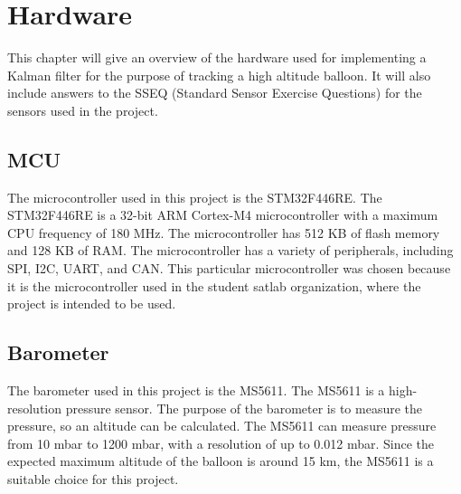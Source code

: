 \chapter{Hardware}\label{ch:hardware}
This chapter will give an overview of the hardware used for implementing a Kalman filter for the purpose of tracking a high altitude balloon.
It will also include answers to the SSEQ (Standard Sensor Exercise Questions) for the sensors used in the project.

\section{MCU}\label{sec:mcu}
The microcontroller used in this project is the STM32F446RE. The STM32F446RE is a 32-bit ARM Cortex-M4 microcontroller with a maximum CPU frequency of 180 MHz. 
The microcontroller has 512 KB of flash memory and 128 KB of RAM. 
The microcontroller has a variety of peripherals, including SPI, I2C, UART, and CAN. 
This particular microcontroller was chosen because it is the microcontroller used in the student satlab organization, where the project is intended to be used. 

\section{Barometer}\label{sec:barometer}
The barometer used in this project is the MS5611. 
The MS5611 is a high-resolution pressure sensor. The purpose of the barometer is to measure the pressure, so an altitude can be calculated.
The MS5611 can measure pressure from 10 mbar to 1200 mbar, with a resolution of up to 0.012 mbar. %
Since the expected maximum altitude of the balloon is around 15 km, the MS5611 is a suitable choice for this project.

